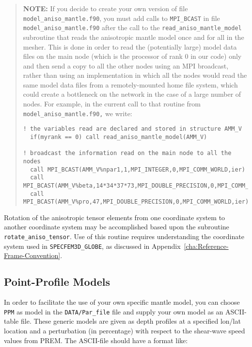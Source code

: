 \begin{quote}
\textbf{NOTE:} If you decide to create your own version of file \texttt{model\_aniso\_mantle.f90},
you must add calls to \texttt{MPI\_BCAST} in file \texttt{model\_aniso\_mantle.f90}
after the call to the \texttt{read\_aniso\_mantle\_model} subroutine
that reads the anisotropic mantle model once and for all in the mesher.
This is done in order to read the (potentially large) model data files
on the main node (which is the processor of rank 0 in our code)
only and then send a copy to all the other nodes using an MPI broadcast,
rather than using an implementation in which all the nodes would read
the same model data files from a remotely-mounted home file system,
which could create a bottleneck on the network in the case of a large
number of nodes. For example, in the current call to that routine
from \texttt{model\_aniso\_mantle.f90,} we write:

{\footnotesize
\begin{verbatim}
! the variables read are declared and stored in structure AMM_V
  if(myrank == 0) call read_aniso_mantle_model(AMM_V)

! broadcast the information read on the main node to all the nodes
  call MPI_BCAST(AMM_V%npar1,1,MPI_INTEGER,0,MPI_COMM_WORLD,ier)
  call MPI_BCAST(AMM_V%beta,14*34*37*73,MPI_DOUBLE_PRECISION,0,MPI_COMM_WORLD,ier)
  call MPI_BCAST(AMM_V%pro,47,MPI_DOUBLE_PRECISION,0,MPI_COMM_WORLD,ier)
\end{verbatim}
}
\end{quote}

Rotation of the anisotropic tensor elements from one coordinate system
to another coordinate system may be accomplished based upon the subroutine
\texttt{rotate\_aniso\_tensor}. Use of this routine requires understanding
the coordinate system used in \texttt{SPECFEM3D\_GLOBE}, as discussed
in Appendix~\ref{cha:Reference-Frame-Convention}.\newline


\subsection{Point-Profile Models}\label{sub:Point-Profile-Models}

In order to facilitate the use of your own specific mantle model, you can choose \texttt{PPM} as model in the \texttt{DATA/Par\_file} file
and supply your own model as an ASCII-table file. These generic models are given as depth profiles at a specified lon/lat location
and a perturbation (in percentage) with respect to the shear-wave speed values from PREM. The ASCII-file should have a format like:

